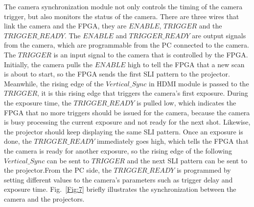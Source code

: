 \documentclass[]{spie}  %
\begin{document}
The camera synchronization module not only controls the timing of the camera trigger, but also monitors the status of the camera. There are three wires that link the camera and the FPGA, they are $ENABLE$, $TRIGGER$ and the $TRIGGER\_READY$. The $ENABLE$ and $TRIGGER\_READY$ are output signals from the camera, which are programmable from the PC connected to the camera. The $TRIGGER$ is an input signal to the camera that is controlled by the FPGA. Initially, the camera pulls the $ENABLE$ high to tell the FPGA that a new scan is about to start, so the FPGA sends the first SLI pattern to the projector. Meanwhile, the rising edge of the $Vertical\_Sync$ in HDMI module is passed to the $TRIGGER$, it is this rising edge that triggers the camera's first exposure. During the exposure time, the $TRIGGER\_READY$ is pulled low, which indicates the FPGA that no more triggers should be issued for the camera, because the camera is busy processing the current exposure and not ready for the next shot. Likewise, the projector should keep displaying the same SLI pattern. Once an exposure is done, the $TRIGGER\_READY$ immediately goes high,  which tells the FPGA that the camera is ready for another exposure, so the rising edge of the following $Vertical\_Sync$ can be sent to $TRIGGER$ and the next SLI pattern can be sent to the projector.From the PC side, the $TRIGGER\_READY$ is programmed by setting different values to the camera's parameters such as trigger delay and exposure time. Fig.~\ref{Fig:7} briefly illustrates the synchronization between the camera and the projectors.
\end{document}
